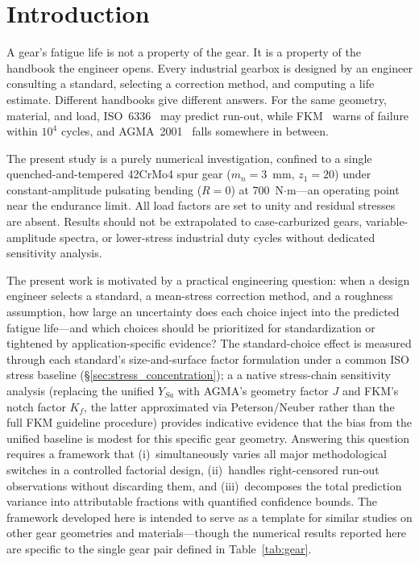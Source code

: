 \documentclass[twocolumn,12pt,a4paper]{article}
\begin{document}
\section{Introduction}
\label{sec:intro}

A gear's fatigue life is not a property of the gear. It is a property
of the handbook the engineer opens. Every industrial gearbox is designed
by an engineer consulting a standard, selecting a correction method, and
computing a life estimate. Different handbooks give different answers.
For the same geometry, material, and load, ISO~6336~\cite{iso6336} may
predict run-out, while FKM~\cite{fkm} warns of failure within $10^4$
cycles, and AGMA~2001~\cite{agma2001} falls somewhere in between.

The present study is a purely numerical investigation, confined to a
single quenched-and-tempered 42CrMo4 spur gear ($m_n=3$~mm,
$z_1=20$) under constant-amplitude pulsating bending ($R=0$) at
700~N$\cdot$m---an operating point near the endurance limit. All
load factors are set to unity and residual stresses are absent.
Results should not be extrapolated to case-carburized gears,
variable-amplitude spectra, or lower-stress industrial duty cycles
without dedicated sensitivity analysis.

The present work is motivated by a practical engineering question:
when a design engineer selects a standard, a mean-stress correction
method, and a roughness assumption, how large an uncertainty does each
choice inject into the predicted fatigue life---and which choices
should be prioritized for standardization or tightened by
application-specific evidence? The standard-choice effect is measured
through each standard's size-and-surface factor formulation under a
common ISO stress baseline (\S\ref{sec:stress_concentration}); a
a native stress-chain sensitivity analysis (replacing the unified
$Y_{Sa}$ with AGMA's geometry factor $J$ and FKM's notch factor
$K_f$, the latter approximated via Peterson/Neuber rather than the
full FKM guideline procedure) provides indicative evidence that the
bias from the unified baseline is modest for this specific gear
geometry. Answering this question
requires a framework that (i)~simultaneously varies all major
methodological switches in a controlled factorial design,
(ii)~handles right-censored
run-out observations without discarding them, and (iii)~decomposes the
total prediction variance into attributable fractions with quantified
confidence bounds. The framework developed here is intended to serve as
a template for similar studies on other gear geometries and
materials---though the numerical results reported here are specific
to the single gear pair defined in Table~\ref{tab:gear}.
\end{document}
